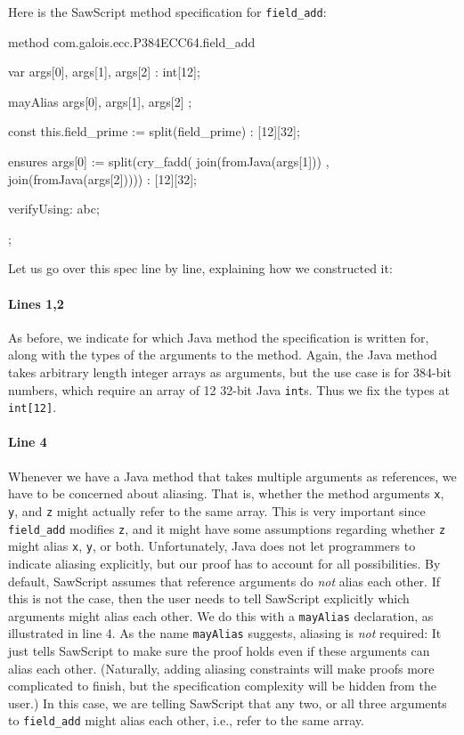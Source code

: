 \documentclass[12pt]{galois-whitepaper}
\newcommand{\sawScript}{{\sc SawScript}\xspace}
\begin{document}
Here is the \sawScript method specification for {\tt field\_add}:
\begin{code}[numbers=left]
  method com.galois.ecc.P384ECC64.field_add {
    var args[0], args[1], args[2] : int[12];
  
    mayAlias { args[0], args[1], args[2] };
  
    const this.field_prime := split(field_prime) : [12][32];
  
    ensures args[0] := 
        split(cry_fadd( join(fromJava(args[1]))
                      , join(fromJava(args[2])))) : [12][32];
  
    verifyUsing: abc;
  };
\end{code}
Let us go over this spec line by line, explaining how we constructed it:

\paragraph{Lines 1,2} As before, we indicate for which Java method the specification is written for, along with the types of the
arguments to the method. Again, the Java method takes arbitrary length integer arrays as arguments, but the use case
is for 384-bit numbers, which require an array of 12 32-bit Java {\tt int}s. Thus we fix the types at {\tt int[12]}.

\paragraph{Line 4} Whenever we have a Java method that takes multiple arguments as references, we have to be
concerned about aliasing. That is, whether the method arguments {\tt x}, {\tt y}, and {\tt z} might actually refer
to the same array. This is very important since {\tt field\_add} modifies {\tt z}, and it might have some
assumptions regarding whether {\tt z} might alias {\tt x}, {\tt y}, or both. Unfortunately, Java does not let programmers
to indicate aliasing explicitly, but our proof has to account for all possibilities.
By default, \sawScript assumes that reference arguments do {\em not} alias each other.
If this is not the case, then the user needs to tell \sawScript explicitly which arguments might alias each other. We do
this with a {\tt mayAlias} declaration, as illustrated in line 4. As the name {\tt mayAlias}
suggests, aliasing is {\em not} required: It just tells \sawScript to make sure the proof holds even if these arguments
can alias each other. (Naturally, adding aliasing constraints will make proofs more complicated to finish, but the specification complexity
will be hidden from the user.) In this case, we are telling
\sawScript that any two, or all three arguments to {\tt field\_add} might alias each other, i.e., refer to the same array.
\end{document}
